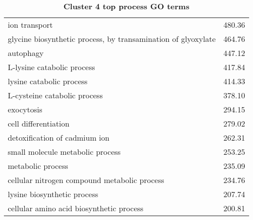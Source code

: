 \begin{table}[h]
\begin{center}
\begin{tabular}{p{}r}
ion transport                                                 & 480.36                      \\
glycine biosynthetic process, by transamination of glyoxylate & 464.76                      \\
autophagy                                                     & 447.12                      \\
L-lysine catabolic process                                    & 417.84                      \\
lysine catabolic process                                      & 414.33                      \\
L-cysteine catabolic process                                  & 378.10                      \\
exocytosis                                                    & 294.15                      \\
cell differentiation                                          & 279.02                      \\ %
detoxification of cadmium ion                                 & 262.31                      \\
small molecule metabolic process                              & 253.25                      \\
metabolic process                                             & 235.09                      \\
cellular nitrogen compound metabolic process                  & 234.76                      \\
lysine biosynthetic process                                   & 207.74                      \\
cellular amino acid biosynthetic process                      & 200.81                      \\ \bottomrule                                                           
\end{tabular}
\end{center}

\caption[Cluster 4 top process GO terms]{\sf \textbf{Cluster 4 top process GO terms}}
\label{tab:cls4-process}
\end{table}